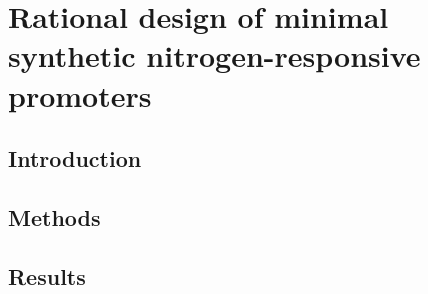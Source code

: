 \documentclass[../main.tex]{subfiles}
\begin{document}
\chapter{Rational design of minimal synthetic nitrogen-responsive promoters}
\label{chapter4}
\section{Introduction}
\label{chapter4:introduction}
\section{Methods}
\label{chapter4:methods}
\section{Results}
\label{chapter4:results}
\end{document}
